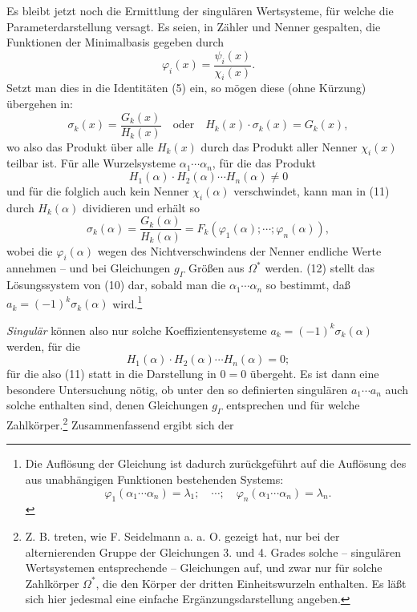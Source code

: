 \documentclass[11pt]{article}
\begin{document}
Es bleibt jetzt noch die Ermittlung der singulären Wertsysteme, für welche die Parameterdarstellung versagt. Es seien, in Zähler und Nenner gespalten, die Funktionen der Minimalbasis gegeben durch
\[
\varphi_i(x)=\frac{\psi_i(x)}{\chi_i(x)}.
\]
Setzt man dies in die Identitäten (5) ein, so mögen diese (ohne Kürzung) übergehen in:
\begin{equation}
\sigma_k(x)=\frac{G_k(x)}{H_k(x)}\quad\text{oder}\quad H_k(x)\cdot\sigma_k(x)=G_k(x),
\tag{11}
\end{equation}
wo also das Produkt über alle $H_k(x)$ durch das Produkt aller Nenner $\chi_i(x)$ teilbar ist. Für alle Wurzelsysteme $\alpha_1\cdots\alpha_n$, für die das Produkt
\[
H_1(\alpha)\cdot H_2(\alpha)\cdots H_n(\alpha)\neq0
\]
und für die folglich auch kein Nenner $\chi_i(\alpha)$ verschwindet, kann man in (11) durch $H_k(\alpha)$ dividieren und erhält so
\begin{equation}
\sigma_k(\alpha)=\frac{G_k(\alpha)}{H_k(\alpha)}=F_k(\varphi_1(\alpha);\cdots;\varphi_n(\alpha)),
\tag{12}
\end{equation}
wobei die $\varphi_i(\alpha)$ wegen des Nichtverschwindens der Nenner endliche Werte annehmen -- und bei Gleichungen $g_\Gamma$ Größen aus $\Omega^*$ werden. (12) stellt das Lösungssystem von (10) dar, sobald man die $\alpha_1\cdots\alpha_n$ so bestimmt, daß $a_k=(-1)^k\sigma_k(\alpha)$ wird.\footnote{Die Auflösung der Gleichung ist dadurch zurückgeführt auf die Auflösung des aus unabhängigen Funktionen bestehenden Systems:
\[
\varphi_1(\alpha_1\cdots\alpha_n)=\lambda_1;\quad \cdots;\quad \varphi_n(\alpha_1\cdots\alpha_n)=\lambda_n.
\]}

\emph{Singulär} können also nur solche Koeffizientensysteme $a_k=(-1)^k\sigma_k(\alpha)$ werden, für die
\[
H_1(\alpha)\cdot H_2(\alpha)\cdots H_n(\alpha)=0;
\]
für die also (11) statt in die Darstellung in $0=0$ übergeht. Es ist dann eine besondere Untersuchung nötig, ob unter den so definierten singulären $a_1\cdots a_n$ auch solche enthalten sind, denen Gleichungen $g_\Gamma$ entsprechen und für welche Zahlkörper.\footnote{Z. B. treten, wie F. Seidelmann a. a. O. gezeigt hat, nur bei der alternierenden Gruppe der Gleichungen 3. und 4. Grades solche -- singulären Wertsystemen entsprechende -- Gleichungen auf, und zwar nur für solche Zahlkörper $\Omega^*$, die den Körper der dritten Einheitswurzeln enthalten. Es läßt sich hier jedesmal eine einfache Ergänzungsdarstellung angeben.} Zusammenfassend ergibt sich der
\end{document}
